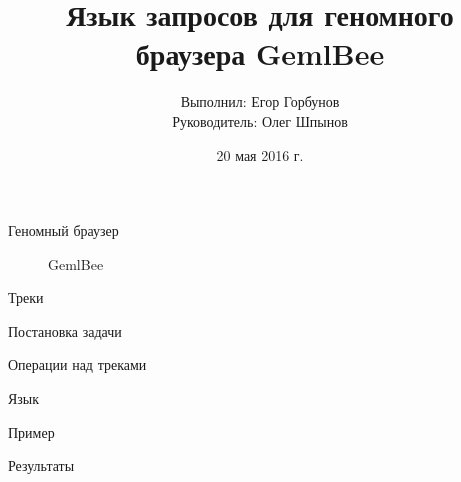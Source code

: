

\title{Язык запросов для геномного браузера GemlBee}
\author[Егор Горбунов]{
	Выполнил: \hfill Егор Горбунов \\
	Руководитель:  \hfill Олег Шпынов
}
\date{20 мая 2016 г.}


\maketitle

\begin{frame}{Геномный браузер}
\begin{figure}[ht!]
\centering
{}
\caption{GemlBee}
\end{figure}
\end{frame}

\begin{frame}{Треки}
\end{frame}

\begin{frame}{Постановка задачи}
\end{frame}

\begin{frame}{Операции над треками}
\end{frame}

\begin{frame}{Язык}
\end{frame}

\begin{frame}{Пример}
\end{frame}

\begin{frame}{Результаты}
\end{frame}

